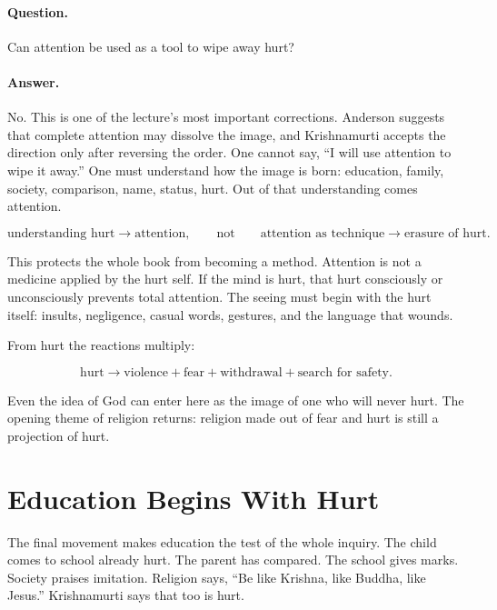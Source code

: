 \documentclass[11pt,oneside]{book}
\begin{document}
\paragraph{Question.}
Can attention be used as a tool to wipe away hurt?

\paragraph{Answer.}
No. This is one of the lecture's most important corrections. Anderson suggests that complete attention may dissolve the image, and Krishnamurti accepts the direction only after reversing the order. One cannot say, ``I will use attention to wipe it away.'' One must understand how the image is born: education, family, society, comparison, name, status, hurt. Out of that understanding comes attention.

\begin{equation}
\text{understanding hurt}
\longrightarrow
\text{attention},
\qquad
\text{not}
\qquad
\text{attention as technique}
\longrightarrow
\text{erasure of hurt}.
\end{equation}

This protects the whole book from becoming a method. Attention is not a medicine applied by the hurt self. If the mind is hurt, that hurt consciously or unconsciously prevents total attention. The seeing must begin with the hurt itself: insults, negligence, casual words, gestures, and the language that wounds.

From hurt the reactions multiply:

\begin{equation}
\text{hurt}
\longrightarrow
\text{violence}+\text{fear}+\text{withdrawal}+\text{search for safety}.
\end{equation}

Even the idea of God can enter here as the image of one who will never hurt. The opening theme of religion returns: religion made out of fear and hurt is still a projection of hurt.

\section{Education Begins With Hurt}

The final movement makes education the test of the whole inquiry. The child comes to school already hurt. The parent has compared. The school gives marks. Society praises imitation. Religion says, ``Be like Krishna, like Buddha, like Jesus.'' Krishnamurti says that too is hurt.
\end{document}

